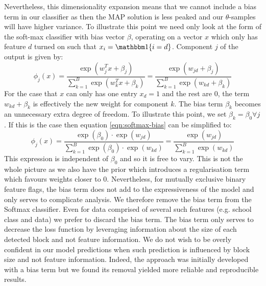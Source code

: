 Nevertheless, this dimensionality expansion means that we cannot include a bias term in our classifier as then the MAP solution is less peaked and our $\theta$-samples will have higher variance. To illustrate this point we need only look at the form of the soft-max classifier with bias vector $\beta$, operating on a vector $x$ which only has feature $d$ turned on such that $x_i = \one\{i = d\}$. Component $j$ of the output is given by:
%
\begin{equation}
	\phi_j(x) = \frac{\exp(w_j^T x + \beta_j)}{\sum_{k=1}^{B} \exp(w_k^T x + \beta_k)} = 
	\frac{\exp(w_{jd} + \beta_j)}{\sum_{k=1}^{B} \exp({w_{kd} + \beta_k})}
	\label{eqn:softmax-bias}
\end{equation}
%
For the case that $x$ can only has one entry $x_d=1$ and the rest are 0, the term $w_{kd} + \beta_k$ is effectively the new weight for component $k$. The bias term $\beta_k$ becomes an unnecessary extra degree of freedom. To illustrate this point, we set $\beta_k=\beta_0 \forall j$. If this is the case then equation \ref{eqn:softmax-bias} can be simplified to:
%
\begin{equation}
	\phi_j(x) = \frac{\exp(\beta_0) \cdot \exp(w_{jd})}{\sum_{k=1}^{B} \exp(\beta_0) \cdot \exp(w_{kd})}
	= \frac{\exp(w_{jd})}{\sum_{k=1}^{B} \exp(w_{kd})}
\end{equation}
%
This expression is independent of $\beta_0$ and so it is free to vary. This is not the whole picture as we also have the prior which introduces a regularisation term which favours weights closer to 0. Nevertheless, for mutually exclusive binary feature flags, the bias term does not add to the expressiveness of the model and only serves to complicate analysis. We therefore remove the bias term from the Softmax classifier. Even for data comprised of several such features (e.g. school class and data) we prefer to discard the bias term. The bias term only serves to decrease the loss function by leveraging information about the size of each detected block and not feature information. We do not wish to be overly confident in our model predictions when such prediction is influenced by block size and not feature information. Indeed, the approach was initially developed with a bias term but we found its removal yielded more reliable and reproducible results.